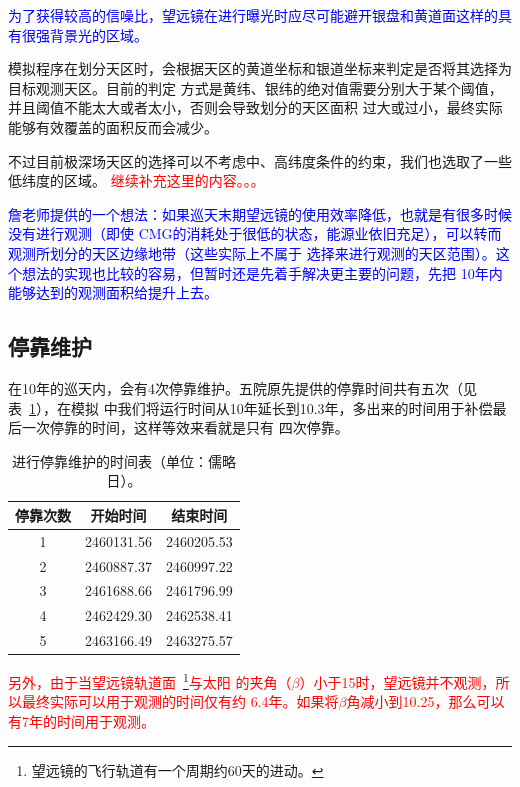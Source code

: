 \documentclass[a4paper,11pt]{ctexart}
\def\blankpage{%
      \clearpage%
      \thispagestyle{empty}%
      \addtocounter{page}{-1}%
      \null%
      \clearpage}
\newcommand{\RT}[1]{\textcolor{red}{#1}}
\newcommand{\BT}[1]{\textcolor{blue}{#1}}
\begin{document}
\BT{\heiti 为了获得较高的信噪比，望远镜在进行曝光时应尽可能避开银盘和黄道面这样的具有很强背景光的区域。}

模拟程序在划分天区时，会根据天区的黄道坐标和银道坐标来判定是否将其选择为目标观测天区。目前的判定
方式是黄纬、银纬的绝对值需要分别大于某个阈值，并且阈值不能太大或者太小，否则会导致划分的天区面积
过大或过小，最终实际能够有效覆盖的面积反而会减少。

不过目前极深场天区的选择可以不考虑中、高纬度条件的约束，我们也选取了一些低纬度的区域。
\RT{继续补充这里的内容。。。}

\BT{詹老师提供的一个想法：如果巡天末期望远镜的使用效率降低，也就是有很多时候没有进行观测（即使
CMG的消耗处于很低的状态，能源业依旧充足），可以转而观测所划分的天区边缘地带（这些实际上不属于
选择来进行观测的天区范围）。这个想法的实现也比较的容易，但暂时还是先着手解决更主要的问题，先把
10年内能够达到的观测面积给提升上去。}

\subsection{停靠维护}
在10年的巡天内，会有4次停靠维护。五院原先提供的停靠时间共有五次（见表~\ref{tab:stoptime}），在模拟
中我们将运行时间从10年延长到10.3年，多出来的时间用于补偿最后一次停靠的时间，这样等效来看就是只有
四次停靠。

\begin{table}[h!]
\renewcommand{\arraystretch}{1}
\centering
\begin{tabular}{c|c|c}
\toprule
停靠次数 & 开始时间 & 结束时间 \\
\hline
1 & 2460131.56 & 2460205.53 \\
\hline
2 & 2460887.37 & 2460997.22 \\
\hline
3 & 2461688.66 & 2461796.99 \\
\hline
4 & 2462429.30 & 2462538.41 \\
\hline
5 & 2463166.49 & 2463275.57 \\
\bottomrule
\end{tabular}
\caption{进行停靠维护的时间表（单位：儒略日）。}
\label{tab:stoptime}
\end{table}

\RT{\heiti 另外，由于当望远镜轨道面~\footnote{望远镜的飞行轨道有一个周期约60天的进动。}与太阳
的夹角（$\beta$）小于15\textdegree 时，望远镜并不观测，所以最终实际可以用于观测的时间仅有约
6.4年。如果将$\beta$角减小到10.25\textdegree，那么可以有7年的时间用于观测。}

\blankpage
\end{document}

